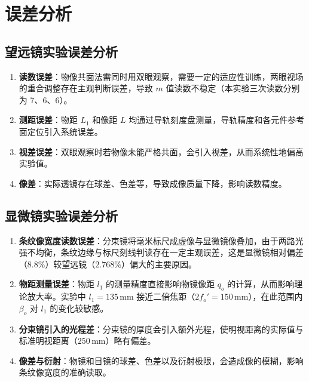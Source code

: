 \documentclass[12pt, a4paper]{article}
\begin{document}
\section{误差分析}
\label{sec:error}

\subsection{望远镜实验误差分析}

\begin{enumerate}
  \item \textbf{读数误差}：物像共面法需同时用双眼观察，需要一定的适应性训练，两眼视场的重合调整存在主观判断误差，导致 $m$ 值读数不稳定（本实验三次读数分别为 7、6、6）。

  \item \textbf{测距误差}：物距 $L_1$ 和像距 $L$ 均通过导轨刻度盘测量，导轨精度和各元件参考面定位引入系统误差。

  \item \textbf{视差误差}：双眼观察时若物像未能严格共面，会引入视差，从而系统性地偏高实验值。

  \item \textbf{像差}：实际透镜存在球差、色差等，导致成像质量下降，影响读数精度。
\end{enumerate}

\subsection{显微镜实验误差分析}

\begin{enumerate}
  \item \textbf{条纹像宽度读数误差}：分束镜将毫米标尺成虚像与显微镜像叠加，由于两路光强不均衡，条纹边缘与标尺刻线判读存在一定主观误差，这是显微镜相对偏差（$8.8\%$）较望远镜（$2.768\%$）偏大的主要原因。

  \item \textbf{物距测量误差}：物距 $l_1$ 的测量精度直接影响物镜像距 $q_o$ 的计算，从而影响理论放大率。实验中 $l_1=135\,\text{mm}$ 接近二倍焦距（$2f_o'=150\,\text{mm}$），在此范围内 $\beta_o$ 对 $l_1$ 的变化较敏感。

  \item \textbf{分束镜引入的光程差}：分束镜的厚度会引入额外光程，使明视距离的实际值与标准明视距离（$250\,\text{mm}$）略有偏差。

  \item \textbf{像差与衍射}：物镜和目镜的球差、色差以及衍射极限，会造成像的模糊，影响条纹像宽度的准确读取。
\end{enumerate}
\end{document}

